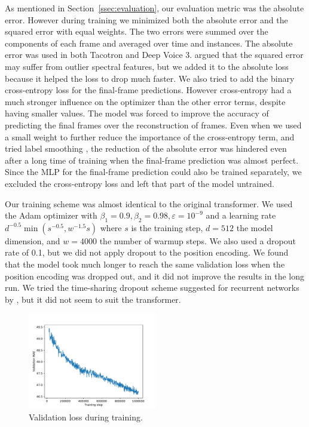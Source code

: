 \documentclass[11pt]{article}
\begin{document}
As mentioned in Section~\ref{ssec:evaluation},
our evaluation metric was the absolute error.
However during training we minimized both the absolute error and the squared error with equal weights.
The two errors were summed over the components of each frame and averaged over time and instances.
The absolute error was used in both Tacotron and Deep Voice 3.
\textcite{ping2017deep} argued that the squared error may suffer from outlier spectral features,
but we added it to the absolute loss because it helped the loss to drop much faster.
We also tried to add the binary cross-entropy loss for the final-frame predictions.
However cross-entropy had a much stronger influence on the optimizer
than the other error terms, despite having smaller values.
The model was forced to improve the accuracy of predicting the final frames
over the reconstruction of frames.
Even when we used a small weight to further reduce the importance of the cross-entropy term,
and tried label smoothing \parencite{szegedy2016rethinking},
the reduction of the absolute error was hindered even after a long time of training
when the final-frame prediction was almost perfect.
Since the MLP for the final-frame prediction could also be trained separately,
we excluded the cross-entropy loss and left that part of the model untrained.

Our training scheme was almost identical to the original transformer.
We used the Adam optimizer \parencite{kingma2014adam} with
\(\beta_{1} = 0.9, \beta_{2} = 0.98, \varepsilon = 10^{-9}\)
and a learning rate
\(d^{-0.5} \min \left(s^{-0.5}, w^{-1.5}s\right)\)
where \(s\) is the training step,
\(d = 512\) the model dimension,
and \(w = 4000\) the number of warmup steps.
We also used a dropout rate of 0.1,
but we did not apply dropout to the position encoding.
We found that the model took much longer to reach the same validation loss
when the position encoding was dropped out,
and it did not improve the results in the long run.
We tried the time-sharing dropout scheme suggested for recurrent networks
by \textcite{gal2016theoretically},
but it did not seem to suit the transformer.

\begin{figure}
  \centering
  \includegraphics[width=0.5\textwidth]{image/loss.pdf}
  \caption{\label{fig:loss}Validation loss during training.}
\end{figure}
\end{document}
